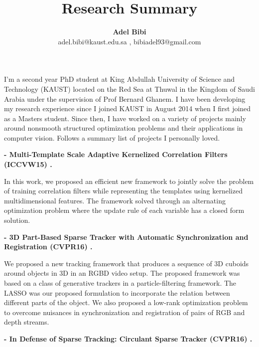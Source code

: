 \documentclass[article]{llncs}
\begin{document}
 \title{Research Summary}
\author{\textbf{Adel Bibi} \\  {adel.bibi@kaust.edu.sa} , {bibiadel93@gmail.com} }



\maketitle
I'm a second year PhD student at King Abdullah University of Science and Technology (KAUST) located on the Red Sea at Thuwal in the Kingdom of Saudi Arabia under the supervision of Prof Bernard Ghanem. I have been developing my research experience since I joined KAUST in August 2014 when I first joined as a Masters student. Since then, I have worked on a variety of projects mainly around nonsmooth structured optimization problems and their applications in computer vision. Follows a summary list of projects I personally loved. 
\newline


\noindent \textbf{- Multi-Template Scale Adaptive Kernelized Correlation Filters (ICCVW15) \cite{bibi2015multi}.}

In this work, we proposed an efficient new framework to jointly solve the problem of training correlation filters while representing the templates using kernelized multidimensional features. The framework solved through an alternating optimization problem where the update rule of each variable has a closed form solution. 
\newline

\noindent \textbf{- 3D Part-Based Sparse Tracker with Automatic Synchronization and Registration (CVPR16) \cite{bibi20163d}.}

We proposed a new tracking framework that produces a sequence of 3D cuboids around objects in 3D in an RGBD video setup. The proposed framework was based on a class of generative trackers in a particle-filtering framework. The LASSO was our proposed formulation to incorporate the relation between different parts of the object. We also proposed a low-rank optimization problem to overcome nuisances in synchronization and registration of pairs of RGB and depth streams.
\newline



\noindent \textbf{- In Defense of Sparse Tracking: Circulant Sparse Tracker (CVPR16) \cite{zhang2016defense}.}
\end{document}
